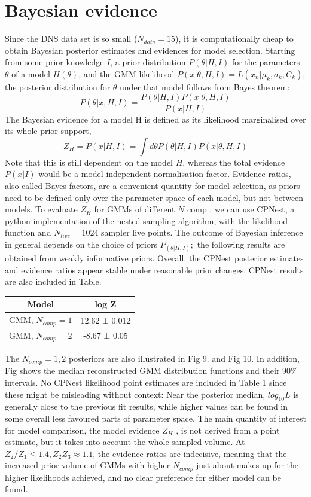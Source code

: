 \documentclass[journal,12pt,twocolumn]{IEEEtran}
\begin{document}
\section{Bayesian evidence}
Since the DNS data set is so small ($N_{data} = 15$), it is computationally cheap to obtain Bayesian posterior estimates and evidences for model selection. Starting from some prior knowledge $I$, a prior distribution $P(\theta | H,I)$ for the parameters $\theta$ of a model $H(\theta)$, and the GMM likelihood $P(x|\theta,H,I)=L(x_n|{\mu_k, \sigma_k, C_k})$, the posterior distribution for $\theta$ under that model follows from Bayes theorem:
\begin{equation}
	P(\theta|x,H,I) = \frac{P(\theta|H,I) P(x|\theta, H, I)}{P(x|H,I)}
\end{equation}
The Bayesian evidence for a model H is defined as its likelihood marginalised over its whole prior support,
\begin{equation}
	Z_H = P(x|H,I) = \int d\theta P(\theta|H,I) P(x|\theta,H,I)
\end{equation}
Note that this is still dependent on the model $H$, whereas the total evidence $P(x|I)$ would be a model-independent normalisation factor. Evidence ratios, also called Bayes factors, are a convenient quantity for model selection, as priors need to be defined only over the parameter space of each model, but not between models.
To evaluate $Z_H$ for GMMs of different $N$ comp , we can use CPNest, a python implementation of the nested sampling algorithm, with the likelihood function and $N_{live} = 1024$ sampler live points. The outcome of Bayesian inference in general depends on the choice of priors $P_(\theta| H,I);$ the following results are obtained from weakly informative priors. Overall, the CPNest posterior estimates and evidence ratios appear stable under reasonable prior changes.
CPNest results are also included in Table. 
\begin{center}
\begin{tabular}{|c|c|}
\hline
Model & log Z\\
\hline
GMM, $N_{comp}=1$ & 12.62 ± 0.012\\
\hline
GMM, $N_{comp}=2$ & -8.67 ± 0.05\\
\hline
\end{tabular}
\end{center}
The $N_{comp} = 1,2$ posteriors are also illustrated in Fig 9. and Fig 10. In addition, Fig shows the median reconstructed GMM distribution functions and their $90\%$ intervals. No CPNest likelihood point estimates are included in Table 1 since these might be misleading without context: Near the posterior median, $log_{10} L$ is generally close to the previous fit results, while higher values can be found in some overall less favoured parts of parameter space. The main quantity of interest for model comparison, the model evidence $Z_H$ , is not derived from a point estimate, but it takes into account the whole sampled volume. At $Z_2/Z_1 \leq 1.4, Z_2Z_3 \approx 1.1$, the evidence ratios are indecisive, meaning that the increased prior volume of GMMs with higher $N_{comp}$ just about makes up for the higher likelihoods achieved, and no clear preference for either model can be found. 
\end{document}

